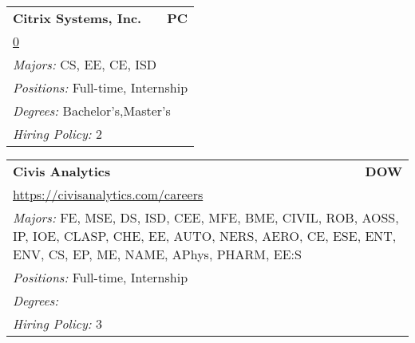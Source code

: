\documentclass[twoside]{article}
\begin{document}
\begin{center}
\begin{multicols}{3}
\begin{FlushLeft}
\begin{minipage}{.9\columnwidth}
\end{minipage}
 
\begin{minipage}{.9\columnwidth}\begin{tabularx}{.95\columnwidth}{Xr}
                 {\Large\bf Citrix Systems, Inc.} & {\Large\bf PC}\\
    \multicolumn{2}{p{.95\columnwidth}}{\url{0}}\\
    \multicolumn{2}{p{.95\columnwidth}}{\emph{Majors:} CS, EE, CE, ISD}\\
    \multicolumn{2}{p{.95\columnwidth}}{\emph{Positions:} Full-time, Internship}\\
    \multicolumn{2}{p{.95\columnwidth}}{\emph{Degrees:} Bachelor's,Master's}\\
    \multicolumn{2}{p{.95\columnwidth}}{\emph{Hiring Policy:} 2}\\
    \end{tabularx}
    
\end{minipage}
 
\begin{minipage}{.9\columnwidth}\begin{tabularx}{.95\columnwidth}{Xr}
                 {\Large\bf Civis Analytics} & {\Large\bf DOW}\\
    \multicolumn{2}{p{.95\columnwidth}}{\url{https://civisanalytics.com/careers}}\\
    \multicolumn{2}{p{.95\columnwidth}}{\emph{Majors:} FE, MSE, DS, ISD, CEE, MFE, BME, CIVIL, ROB, AOSS, IP, IOE, CLASP, CHE, EE, AUTO, NERS, AERO, CE, ESE, ENT, ENV, CS, EP, ME, NAME, APhys, PHARM, EE:S}\\
    \multicolumn{2}{p{.95\columnwidth}}{\emph{Positions:} Full-time, Internship}\\
    \multicolumn{2}{p{.95\columnwidth}}{\emph{Degrees:} }\\
    \multicolumn{2}{p{.95\columnwidth}}{\emph{Hiring Policy:} 3}\\
    \end{tabularx}
    
\end{minipage}
 

\end{FlushLeft}
\end{multicols}
\end{center}
\end{document}
